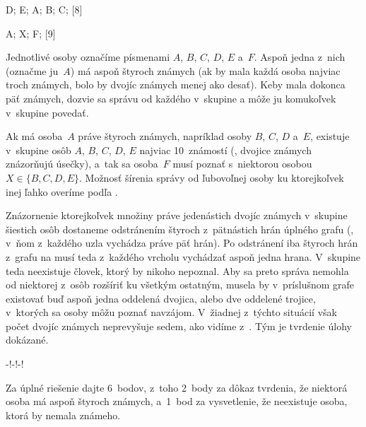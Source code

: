 {%
\fontplace
\bpoint D; \rpoint E; \tpoint A; \tpoint B; \lpoint C;
[8] \hfil\Obr

\fontplace
\rpoint A; \blpoint X; \lpoint F;
[9] \hfil\Obr

\fontplace [10] \hfil\Obr\par
\fontplace [11] \hfill\rlap{\quad\Obr}\par
\fontplace [12]

Jednotlivé osoby označíme písmenami $A$, $B$, $C$, $D$, $E $ a~$F$.
Aspoň jedna z~nich (označme ju~$A$) má aspoň štyroch známych (ak by mala každá
osoba najviac troch známych, bolo by dvojíc známych menej ako desať). Keby
mala dokonca päť známych, dozvie sa správu od každého v~skupine
a môže ju komukoľvek v~skupine povedať.
\twocpictures

Ak má osoba~$A$ práve štyroch známych,
napríklad osoby $B$, $C$, $D$ a~$E$, existuje v~skupine osôb
$A$, $B$, $C$, $D$, $E$ najviac 10~známostí (\obr, dvojice známych znázorňujú
úsečky), a~tak sa osoba~$F$ musí poznať s~niektorou osobou $X \in\{ B,C,D,E\}$.
Možnosť šírenia správy od ľubovoľnej osoby ku ktorejkoľvek inej ľahko
overíme podľa \obr.

\ineriesenie
Znázornenie ktorejkoľvek množiny práve jedenástich dvojíc známych
v~skupine šiestich osôb dostaneme odstránením štyroch z~pätnástich
hrán úplného grafu (\obr, v~ňom z~každého uzla vychádza práve päť hrán).
Po odstránení iba štyroch hrán z~grafu na  musí teda z~každého
vrcholu vychádzať aspoň jedna hrana. V~skupine teda neexistuje
človek, ktorý by nikoho nepoznal. Aby sa preto správa nemohla od
niektorej z~osôb rozšíriť ku všetkým ostatným, musela by v~príslušnom grafe
existovať buď aspoň jedna oddelená dvojica, alebo dve oddelené trojice,
v~ktorých sa osoby môžu poznať navzájom.
V~žiadnej z~týchto situácií však počet dvojíc známych
neprevyšuje sedem, ako vidíme z~\obr. Tým je tvrdenie úlohy dokázané.
\midinsert
\centerline{\inspicture-!\hss\inspicture-!\hss\inspicture-!}
\endinsert

\nobreak\medskip\petit\noindent
Za úplné riešenie dajte 6~bodov,
z~toho 2~body za dôkaz tvrdenia, že niektorá osoba má
aspoň štyroch známych, a~1~bod za vysvetlenie, že neexistuje osoba,
ktorá by nemala známeho.
\endpetit
\bigbreak}

